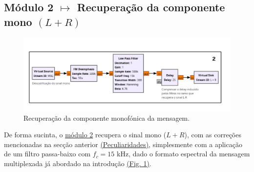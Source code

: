 \subsection{Módulo 2 $\pmb \mapsto$ Recuperaç\~ao da componente mono $(L + R)$}
\label{subsec:mod2}

\begin{figure}[H]
    \centering
    \includegraphics[width = 0.65\linewidth]{img/mods/modulo2.png}
    \caption{Recuperação da componente monofónica da mensagem.}
    \label{fig:modulo2}
\end{figure}

De forma sucinta, o \hyperref[subsec:mod2]{módulo 2} recupera o sinal mono ($L+R$), com as correções mencionadas na secção anterior \hyperref[sec:peculiaridades]{(Peculiaridades)}, simplesmente com a aplicação de um filtro passa-baixo com $f_c = 15$ kHz, dado o formato espectral da mensagem multiplexada já abordado na introdução \hyperref[fig:stereo_spectrum]{(Fig. 1)}. 
